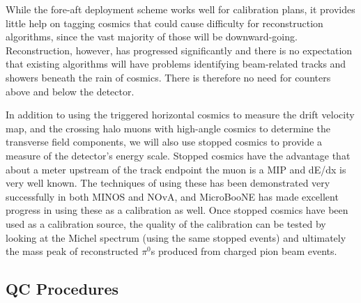  While the fore-aft deployment scheme works well for calibration plans,
it provides little help on tagging cosmics that could cause difficulty for
reconstruction algorithms, since the vast majority of those will be
downward-going.  Reconstruction, however, has progressed significantly and
there is no expectation that existing algorithms will have problems identifying
beam-related tracks and showers beneath the rain of cosmics. There is therefore
no need for counters above and below the detector.

        In addition to using the triggered horizontal cosmics to measure the
drift velocity map, and the crossing halo muons with high-angle cosmics to
determine the transverse field components, we will also use stopped cosmics to
provide a measure of the detector's energy scale. Stopped cosmics have the
advantage that about a meter upstream of the track endpoint the muon is a MIP
and dE/dx is very well known. The techniques of using these has been
demonstrated very successfully in both MINOS and NOvA, and MicroBooNE has made
excellent progress in using these as a calibration as well. Once stopped cosmics have been 
used as a calibration source, the quality of the calibration can be tested by looking at the Michel
spectrum (using the same stopped events) and ultimately the mass peak of
reconstructed $\pi^0$s produced from charged pion beam events.



\subsection{QC Procedures}

